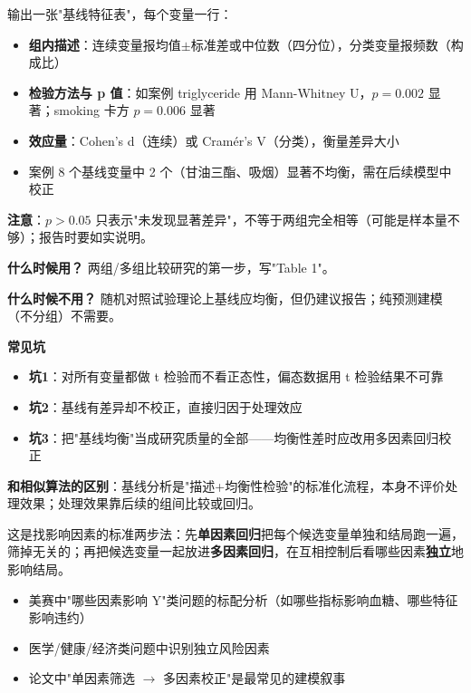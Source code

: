 \begin{algoresult}
输出一张"基线特征表"，每个变量一行：
\begin{itemize}
    \item \textbf{组内描述}：连续变量报均值$\pm$标准差或中位数（四分位），分类变量报频数（构成比）
    \item \textbf{检验方法与 p 值}：如案例 triglyceride 用 Mann-Whitney U，$p=0.002$ 显著；smoking 卡方 $p=0.006$ 显著
    \item \textbf{效应量}：Cohen's d（连续）或 Cramér's V（分类），衡量差异大小
    \item 案例 8 个基线变量中 2 个（甘油三酯、吸烟）显著不均衡，需在后续模型中校正
\end{itemize}

\textbf{注意}：$p>0.05$ 只表示"未发现显著差异"，不等于两组完全相等（可能是样本量不够）；报告时要如实说明。
\end{algoresult}

\begin{algonotes}
\textbf{什么时候用？} 两组/多组比较研究的第一步，写"Table 1"。

\textbf{什么时候不用？} 随机对照试验理论上基线应均衡，但仍建议报告；纯预测建模（不分组）不需要。

\textbf{常见坑}
\begin{itemize}
    \item \textbf{坑1}：对所有变量都做 t 检验而不看正态性，偏态数据用 t 检验结果不可靠
    \item \textbf{坑2}：基线有差异却不校正，直接归因于处理效应
    \item \textbf{坑3}：把"基线均衡"当成研究质量的全部——均衡性差时应改用多因素回归校正
\end{itemize}

\textbf{和相似算法的区别}：基线分析是"描述+均衡性检验"的标准化流程，本身不评价处理效果；处理效果靠后续的组间比较或回归。
\end{algonotes}


\begin{algointro}
这是找影响因素的标准两步法：先\textbf{单因素回归}把每个候选变量单独和结局跑一遍，筛掉无关的；再把候选变量一起放进\textbf{多因素回归}，在互相控制后看哪些因素\textbf{独立}地影响结局。
\end{algointro}

\begin{algoscene}
\begin{itemize}
    \item 美赛中"哪些因素影响 Y"类问题的标配分析（如哪些指标影响血糖、哪些特征影响违约）
    \item 医学/健康/经济类问题中识别独立风险因素
    \item 论文中"单因素筛选 $\to$ 多因素校正"是最常见的建模叙事
\end{itemize}
\end{algoscene}

